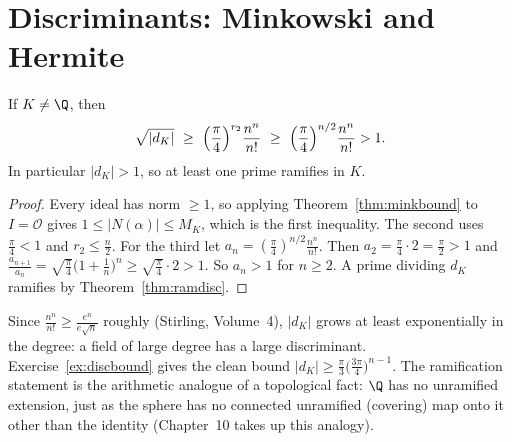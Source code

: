 \section{Discriminants: Minkowski and Hermite}

\begin{theorem}[Minkowski]\label{thm:dkbig}
If $K\ne\Q$, then
\[
\sqrt{|d_K|}\ \ge\ \Bigl(\frac\pi4\Bigr)^{r_2}\frac{n^n}{n!}\ \ge\ \Bigl(\frac\pi4\Bigr)^{n/2}\frac{n^n}{n!}>1.
\]
In particular $|d_K|>1$, so at least one prime ramifies in $K$.
\end{theorem}
\begin{proof}
Every ideal has norm $\ge1$, so applying Theorem~\ref{thm:minkbound} to $I=\mathcal O$ gives $1\le|N(\alpha)|\le M_K$,
which is the first inequality. The second uses $\frac\pi4<1$ and $r_2\le\frac n2$. For the third let
$a_n=(\frac\pi4)^{n/2}\frac{n^n}{n!}$. Then $a_2=\frac\pi4\cdot2=\frac\pi2>1$ and $\frac{a_{n+1}}{a_n}=\sqrt{\frac\pi4}
\bigl(1+\frac1n\bigr)^n\ge\sqrt{\frac\pi4}\cdot2>1$. So $a_n>1$ for $n\ge2$. A prime dividing $d_K$ ramifies by
Theorem~\ref{thm:ramdisc}.
\end{proof}

Since $\frac{n^n}{n!}\ge\frac{e^n}{e\sqrt n}$ roughly (Stirling, Volume~4), $|d_K|$ grows at least exponentially in the
degree: a field of large degree has a large discriminant. Exercise~\ref{ex:discbound} gives the clean bound
$|d_K|\ge\frac\pi3\bigl(\frac{3\pi}4\bigr)^{n-1}$. The ramification statement is the arithmetic analogue of a
topological fact: $\Q$ has no unramified extension, just as the sphere has no connected unramified (covering) map onto it
other than the identity (Chapter~10 takes up this analogy).

